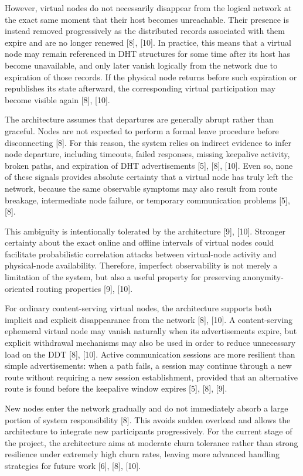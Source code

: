 \documentclass[12pt,a4paper]{article}
\begin{document}
However, virtual nodes do not necessarily disappear from the logical network at the exact same moment that their host becomes unreachable. Their presence is instead removed progressively as the distributed records associated with them expire and are no longer renewed [8], [10]. In practice, this means that a virtual node may remain referenced in DHT structures for some time after its host has become unavailable, and only later vanish logically from the network due to expiration of those records. If the physical node returns before such expiration or republishes its state afterward, the corresponding virtual participation may become visible again [8], [10].

The architecture assumes that departures are generally abrupt rather than graceful. Nodes are not expected to perform a formal leave procedure before disconnecting [8]. For this reason, the system relies on indirect evidence to infer node departure, including timeouts, failed responses, missing keepalive activity, broken paths, and expiration of DHT advertisements [5], [8], [10]. Even so, none of these signals provides absolute certainty that a virtual node has truly left the network, because the same observable symptoms may also result from route breakage, intermediate node failure, or temporary communication problems [5], [8].

This ambiguity is intentionally tolerated by the architecture [9], [10]. Stronger certainty about the exact online and offline intervals of virtual nodes could facilitate probabilistic correlation attacks between virtual-node activity and physical-node availability. Therefore, imperfect observability is not merely a limitation of the system, but also a useful property for preserving anonymity-oriented routing properties [9], [10].

For ordinary content-serving virtual nodes, the architecture supports both implicit and explicit disappearance from the network [8], [10]. A content-serving ephemeral virtual node may vanish naturally when its advertisements expire, but explicit withdrawal mechanisms may also be used in order to reduce unnecessary load on the DDT [8], [10]. Active communication sessions are more resilient than simple advertisements: when a path fails, a session may continue through a new route without requiring a new session establishment, provided that an alternative route is found before the keepalive window expires [5], [8], [9].

New nodes enter the network gradually and do not immediately absorb a large portion of system responsibility [8]. This avoids sudden overload and allows the architecture to integrate new participants progressively. For the current stage of the project, the architecture aims at moderate churn tolerance rather than strong resilience under extremely high churn rates, leaving more advanced handling strategies for future work [6], [8], [10].
\end{document}

